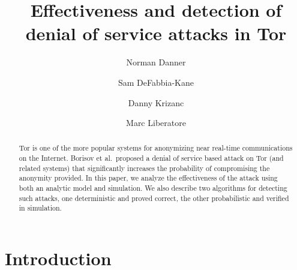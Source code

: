 \documentclass[]{lmcs}
\begin{document}
\title{Effectiveness and detection of \\ denial of service attacks in Tor} 

\def\wesaddr{Department of Mathematics and Computer Science \\
Wesleyan University \\
Middletown, CT 06459 USA
}
\author{Norman Danner}
\address{\wesaddr}

\author{Sam DeFabbia-Kane}
\address{\wesaddr}

\author{Danny Krizanc}
\address{\wesaddr}

\author{Marc Liberatore}
\address{Department of Computer Science \\
University of Massachusetts Amherst \\
Amherst, MA 01003 USA}

\begin{abstract}
Tor is one of the more popular systems for 
anonymizing near real-time communications on the Internet. 
Borisov et al.\ proposed a denial of service 
based attack on Tor (and related systems) that significantly
increases the probability of compromising the anonymity provided. 
In this paper, we analyze the effectiveness of the attack using both
an analytic model and simulation.  We also describe two algorithms for 
detecting such attacks, one deterministic and proved correct, the
other probabilistic and verified in simulation.
\end{abstract}


\maketitle


\section{Introduction}
\end{document}
